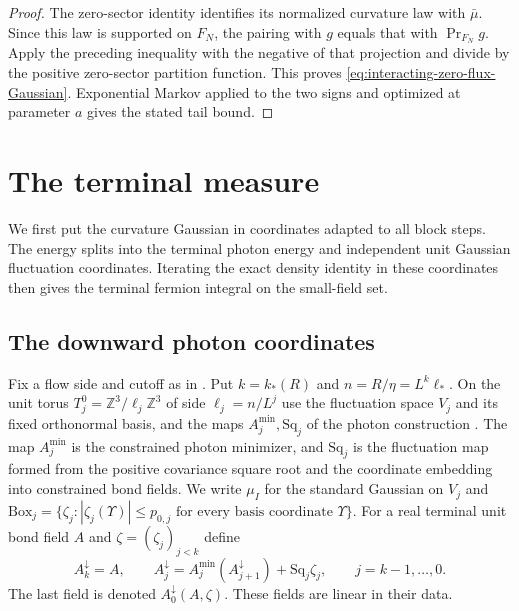 \documentclass[11pt,letterpaper,reqno]{amsart}
\newcommand{\Z}{\mathbb Z}
\begin{document}
\begin{proof}
The zero-sector identity
\cite[(34)]{ReferenceResponse} identifies its
normalized curvature law with $\bar\mu$.
Since this law is supported on $F_N$,
the pairing with $g$ equals that with
$\operatorname{Pr}_{F_N}g$. Apply the
preceding inequality with the negative of
that projection and divide by the positive
zero-sector partition function. This proves
\eqref{eq:interacting-zero-flux-Gaussian}.
Exponential Markov applied to the two
signs and optimized at parameter $a$
gives the stated tail bound.
\end{proof}


\section{The terminal measure}
\label{sec:terminal-partition}

We first put the curvature Gaussian in coordinates
adapted to all block steps. The energy splits into
the terminal photon energy and independent unit
Gaussian fluctuation coordinates. Iterating the exact
density identity in these coordinates then gives
the terminal fermion integral on the small-field set.

\subsection{The downward photon coordinates}
\label{subsec:term-photon-tower}

Fix a flow side and cutoff as in
\cite[Proposition~6.1]{CoverTuning}. Put $k=k_*(R)$ and
$n=R/\eta=L^k\ell_*$.
On the unit torus $T_j^0=\Z^3/\ell_j\Z^3$ of side
$\ell_j=n/L^j$ use the
fluctuation space $V_j$ and its fixed orthonormal
basis, and the maps $A_j^{\min},\mathrm{Sq}_j$ of
the photon construction \cite[\S3.2--3.3]{MaxwellBlock}.
The map $A_j^{\min}$ is the constrained photon minimizer,
and $\mathrm{Sq}_j$ is the fluctuation map formed from the
positive covariance square root and the coordinate embedding
into constrained bond fields. We write $\mu_I$ for the standard Gaussian
on $V_j$ and
$\mathrm{Box}_j=\{\zeta_j:|\zeta_j(\Upsilon)|\le p_{0,j}
\text{ for every basis coordinate }\Upsilon\}$.
For a real terminal unit bond field $A$ and
$\zeta=(\zeta_j)_{j<k}$ define
\begin{equation}\label{eq:term-downward-recursion}
 A_k^\downarrow=A,\qquad
 A_j^\downarrow=A_j^{\min}(A_{j+1}^\downarrow)
                         +\mathrm{Sq}_j\zeta_j,\qquad j=k-1,\ldots,0 .
\end{equation}
The last field is denoted $A_0^\downarrow(A,\zeta)$.
These fields are linear in their data.
\end{document}
